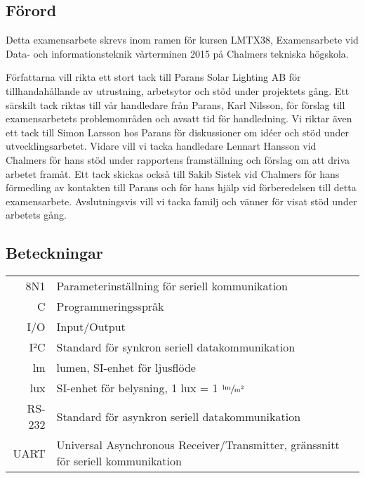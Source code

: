 \newpage
\subsection*{Förord} %
\label{sub:f_rord}
    Detta examensarbete skrevs inom ramen för kursen LMTX38, Examensarbete vid Data- och informationsteknik vårterminen 2015 på Chalmers tekniska högskola. \bigskip

    Författarna vill rikta ett stort tack till Parans Solar Lighting AB för tillhandahållande av utrustning, arbetsytor och stöd under projektets gång. Ett särskilt tack riktas till vår handledare från Parans, Karl Nilsson, för förslag till examensarbetets problemområden och avsatt tid för handledning. Vi riktar även ett tack till Simon Larsson hos Parans för diskussioner om idéer och stöd under utvecklingsarbetet. Vidare vill vi tacka handledare Lennart Hansson vid Chalmers för hans stöd under rapportens framställning och förslag om att driva arbetet framåt. Ett tack skickas också till Sakib Sistek vid Chalmers för hans förmedling av kontakten till Parans och för hans hjälp vid förberedelsen till detta examensarbete. Avslutningsvis vill vi tacka familj och vänner för visat stöd under arbetets gång.


\newpage

\subsection*{Beteckningar} %
\label{sub:beteckningar}
    \begin{tabularx}{\textwidth}{@{}rX}
        8N1 & Parameterinställning för seriell kommunikation \\
        C & Programmeringsspråk \\
        I/O & Input/Output \\
        I²C & Standard för synkron seriell datakommunikation \\
        lm & lumen, SI-enhet för ljusflöde \\
        lux & SI-enhet för belysning, 1 lux = 1 $\sfrac{\text{lm}}{\text{m}^2}$ \\
        RS-232 & Standard för asynkron seriell datakommunikation \\
        UART & Universal Asynchronous Receiver/Transmitter, gränssnitt för seriell kommunikation
        
    \end{tabularx}

